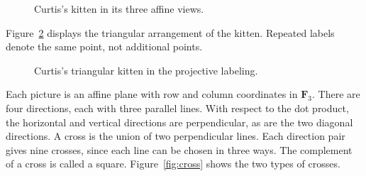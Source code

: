 \documentclass[12pt,letterpaper]{article}
\theoremstyle{definition}\newtheorem{example}[theorem]{Example}
\numberwithin{equation}{section}
\newcommand{\F}{\mathbf F}
\begin{document}
\begin{figure}[ht]
\centering
{}
\caption{Curtis's kitten in its three affine views.}
\label{fig:kitten-threeviews}
\end{figure}

Figure~\ref{fig:kitten-schematic} displays the triangular arrangement of the kitten. Repeated labels denote the same point, not additional points.
\begin{figure}[ht]
\centering
{}
\caption{Curtis's triangular kitten in the projective labeling.}
\label{fig:kitten-schematic}
\end{figure}

Each picture is an affine plane with row and column coordinates in $\F_3$. There are four directions, each with three parallel lines. With respect to the dot product, the horizontal and vertical directions are perpendicular, as are the two diagonal directions. A cross is the union of two perpendicular lines. Each direction pair gives nine crosses, since each line can be chosen in three ways. The complement of a cross is called a square. Figure~\ref{fig:cross} shows the two types of crosses.
\end{document}
